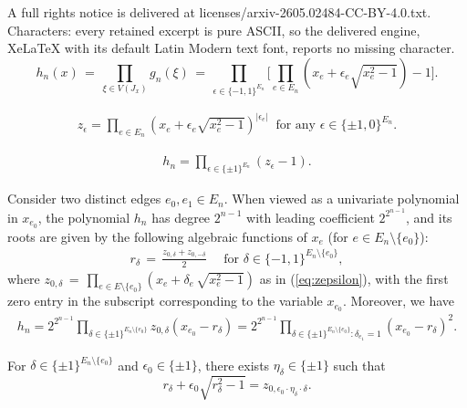 \documentclass[10pt,a4paper]{amsart}
\begin{document}
A full rights notice is delivered at licenses/arxiv-2605.02484-CC-BY-4.0.txt. Characters: every retained excerpt is pure ASCII, so the delivered engine, XeLaTeX with its default Latin Modern text font, reports no missing character.
\begin{equation}\label{eq:hn}
h_n(x) \,  = \, \prod_{\xi \in V(J_x)} g_n(\xi) \, = \, \prod_{\epsilon \in \{-1,1\}^{E_n}} \Big[ \prod_{e \in E_n} (x_e + \epsilon_e \sqrt{x_e^2-1} ) - 1 \Big].
\end{equation}

\begin{align}\label{eq:zepsilon}
z_\epsilon= \prod_{e\in E_n} \left( x_e + \epsilon_e \sqrt{x_e^2-1} \right)^{|\epsilon_e|} \ \text{ for any } \epsilon \in \{\pm1, 0\}^{E_n}.
\end{align}

\begin{align}\label{eq:hnz}
h_n=\prod_{\epsilon\in \{\pm 1\}^{E_n}} (z_\epsilon -1).
\end{align}

\begin{proposition} \label{prop:univleadingterm}
 Consider two distinct edges $e_0,e_1\in E_n$. When viewed as a univariate polynomial in $x_{e_0}$, the polynomial $h_n$ 
has degree $2^{n-1}$ with leading coefficient $2^{2^{n-1}}$, and its roots are given by the following algebraic functions of $x_e$ (for $e \in E_n \setminus \{e_0\}$):
\begin{align}\label{eq:rdelta}
 r_\delta \,  = \, \frac{z_{0,\delta} + z_{0,-\delta}}{2}  \quad \text{ for } \delta \in \{-1,1\}^{E_n \setminus \{e_0\}}, \end{align}
where $z_{0,\delta} \, = \, \prod_{e \in E \setminus \{e_0\}} (x_{e} + \delta_{e} \, \sqrt{x_{e}^2-1} )$ as in (\ref{eq:zepsilon}), with the first zero entry in the subscript corresponding to the variable $x_{e_0}$.
  Moreover,  we have
 \begin{align}\label{eq:hnroot}
 h_n= 2^{2^{n-1}} \prod_{\delta\in \{\pm 1\}^{E_n\setminus \{e_0\}}} z_{0,\delta} (x_{e_0}-r_\delta)
 =2^{2^{n-1}} \prod_{\delta\in \{\pm 1\}^{E_n\setminus \{e_0\}}: \delta_{e_1}=1}  (x_{e_0}-r_\delta)^2.
     \end{align}
    \end{proposition}

\begin{lemma}
\label{lem:z}
For $\delta\in\{\pm 1\}^{E_n\setminus \{e_0\}}$ and $\epsilon_0\in \{\pm 1\}$, there exists $\eta_{\delta}\in\{\pm 1\}$ such that 
\[
r_\delta +\epsilon_0\sqrt{r_\delta^2 -1}= z_{0,\epsilon_0\cdot \eta_\delta \cdot  \delta}.
\]
\end{lemma}
\end{document}
